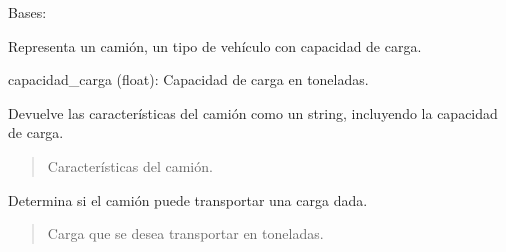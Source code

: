 \documentclass[letterpaper,10pt,spanish]{sphinxmanual}
\begin{document}

\begin{fulllineitems}
\label{\detokenize{pr8:pr8.4.Camion}}
\pysigstartsignatures
{}
\pysigstopsignatures
\sphinxAtStartPar
Bases: {\hyperref[\detokenize{pr8:pr8.4.Vehiculo}]{}}

\sphinxAtStartPar
Representa un camión, un tipo de vehículo con capacidad de carga.
\begin{description}
\sphinxAtStartPar
capacidad\_carga (float): Capacidad de carga en toneladas.

\end{description}

\begin{fulllineitems}
\label{\detokenize{pr8:pr8.4.Camion.caracteristicas}}
\pysigstartsignatures
{}
\pysigstopsignatures
\sphinxAtStartPar
Devuelve las características del camión como un string, incluyendo la capacidad de carga.
\begin{quote}\begin{description}
\sphinxAtStartPar
Características del camión.

\end{description}\end{quote}

\end{fulllineitems}


\begin{fulllineitems}
\label{\detokenize{pr8:pr8.4.Camion.puede_transportar}}
\pysigstartsignatures
{}
\pysigstopsignatures
\sphinxAtStartPar
Determina si el camión puede transportar una carga dada.
\begin{quote}\begin{description}
\sphinxAtStartPar
{} \textendash{} Carga que se desea transportar en toneladas.


\end{description}
\end{quote}
\end{fulllineitems}
\end{fulllineitems}
\end{document}
